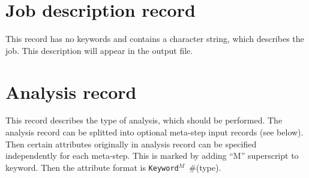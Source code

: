 \documentclass[a4paper]{article}
\newcommand{\param}[1]{\texttt{#1}} %
\newcommand{\field}[2]{\param{#1}~\#{\tiny(#2)}} %
\begin{document}
\section{Job description record}
\label{_JobDescriptionRecord}
This record has no keywords and contains a character string, which
describes the job. This description will appear in the output
file.

\section{Analysis record}
\label{_AnalysisRecord}
This record describes the type of analysis, which should be
performed. The analysis record can be splitted into optional meta-step input records (see below). 
Then certain attributes originally in analysis record can be specified independently for each meta-step. This is marked by
adding ``M'' superscript to keyword. Then the attribute format is \field{Keyword$^M$}{type}.
\end{document}
